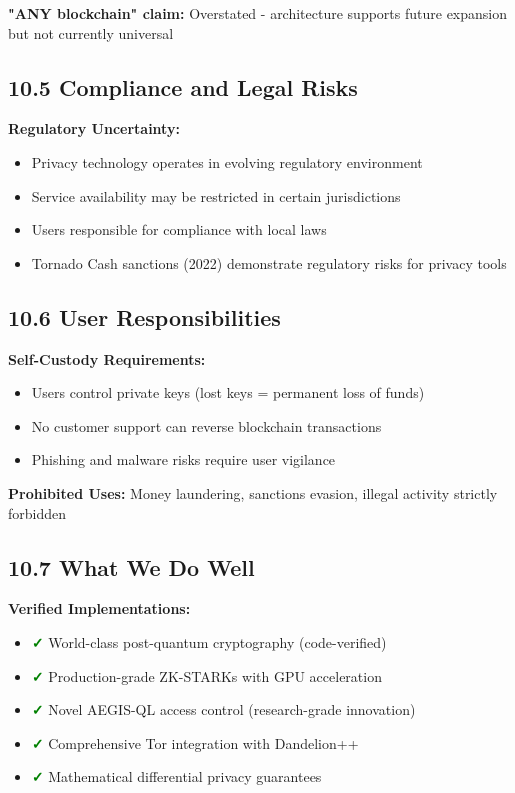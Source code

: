 \documentclass[11pt,a4paper]{article}
\begin{document}
\textbf{"ANY blockchain" claim:} Overstated - architecture supports future expansion but not currently universal

\subsection{10.5 Compliance and Legal Risks}

\textbf{Regulatory Uncertainty:}
\begin{itemize}
    \item Privacy technology operates in evolving regulatory environment
    \item Service availability may be restricted in certain jurisdictions
    \item Users responsible for compliance with local laws
    \item Tornado Cash sanctions (2022) demonstrate regulatory risks for privacy tools
\end{itemize}

\subsection{10.6 User Responsibilities}

\textbf{Self-Custody Requirements:}
\begin{itemize}
    \item Users control private keys (lost keys = permanent loss of funds)
    \item No customer support can reverse blockchain transactions
    \item Phishing and malware risks require user vigilance
\end{itemize}

\textbf{Prohibited Uses:} Money laundering, sanctions evasion, illegal activity strictly forbidden

\subsection{10.7 What We Do Well}

\textbf{Verified Implementations:}
\begin{itemize}
    \item \textcolor{green}{\textbf{✓}} World-class post-quantum cryptography (code-verified)
    \item \textcolor{green}{\textbf{✓}} Production-grade ZK-STARKs with GPU acceleration
    \item \textcolor{green}{\textbf{✓}} Novel AEGIS-QL access control (research-grade innovation)
    \item \textcolor{green}{\textbf{✓}} Comprehensive Tor integration with Dandelion++
    \item \textcolor{green}{\textbf{✓}} Mathematical differential privacy guarantees
\end{itemize}
\end{document}
